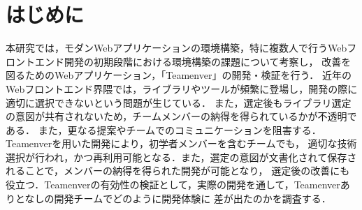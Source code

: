 \documentclass[main]{subfiles}
\begin{document}
\section{はじめに }
本研究では，モダンWebアプリケーションの環境構築，特に複数人で行うWebフロントエンド開発の初期段階における環境構築の課題について考察し，
改善を図るためのWebアプリケーション，「Teamenver」の開発・検証を行う．
近年のWebフロントエンド界隈では，ライブラリやツールが頻繁に登場し，開発の際に適切に選択できないという問題が生じている．
また，選定後もライブラリ選定の意図が共有されないため，チームメンバーの納得を得られているかが不透明である．
また，更なる提案やチームでのコミュニケーションを阻害する．Teamenverを用いた開発により，初学者メンバーを含むチームでも，
適切な技術選択が行われ，かつ再利用可能となる．また，選定の意図が文書化されて保存されることで，メンバーの納得を得られた開発が可能となり，
選定後の改善にも役立つ．Teamenverの有効性の検証として，実際の開発を通して，Teamenverありとなしの開発チームでどのように開発体験に
差が出たのかを調査する．
\end{document}
